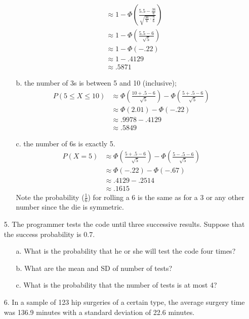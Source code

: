 \documentclass[letterpaper,12pt]{article}
\begin{document}
\begin{enumerate}
\begin{enumerate}
\begin{align*}
          &\approx 1 - \Phi\left(\frac{5.5 - \frac{36}{6}}{\sqrt{\frac{36}{6} \cdot \frac{5}{6}}}\right) \\
          &\approx 1 - \Phi\left(\frac{5.5 - 6}{\sqrt{5}}\right) \\
          &\approx 1 - \Phi(-.22) \\
          &\approx 1 - .4129 \\
          &\approx .5871
        \end{align*}
      \item[b.]
        the number of 3s is between 5 and 10 (inclusive);
        \begin{align*}
          P(5 \le X \le 10) &\approx \Phi\left(\frac{10 + .5 - 6}{\sqrt{5}}\right) - \Phi\left(\frac{5 + .5 - 6}{\sqrt{5}}\right) \\
          &\approx \Phi(2.01) - \Phi(-.22) \\
          &\approx .9978 - .4129 \\
          &\approx .5849
        \end{align*}
      \item[c.]
        the number of 6s is exactly 5.
        \begin{align*}
          P(X = 5) &\approx \Phi\left(\frac{5 + .5 - 6}{\sqrt{5}}\right) - \Phi\left(\frac{5 - .5 - 6}{\sqrt{5}}\right) \\
          &\approx \Phi(-.22)  - \Phi(-.67) \\
          &\approx .4129 - .2514 \\
          &\approx .1615
        \end{align*}
        Note the probability ($\frac{1}{6}$) for rolling a 6 is the same as for a 3 or any other number since the die is symmetric.
    \end{enumerate}
  \item[5.]
    The programmer tests the code until three successive results. Suppose that the success probability is 0.7.
    \begin{enumerate}
      \item[a.]
        What is the probability that he or she will test the code four times?
      \item[b.]
        What are the mean and SD of number of tests?
      \item[c.]
        What is the probability that the number of tests is at most 4?
    \end{enumerate}
  \item[6.]
    In a sample of 123 hip surgeries of a certain type, the average surgery time was 136.9 minutes with a standard deviation of 22.6 minutes.

\end{enumerate}
\end{document}
